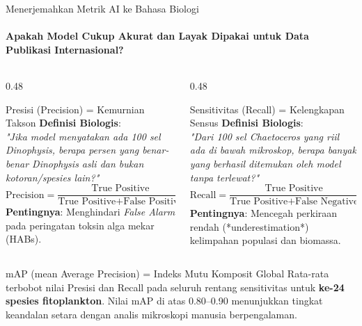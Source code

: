 \documentclass[aspectratio=169, 10pt]{beamer}
\begin{document}
\begin{frame}{Menerjemahkan Metrik AI ke Bahasa Biologi}
    \framesubtitle{Apakah Model Cukup Akurat dan Layak Dipakai untuk Data Publikasi Internasional?}
    
    \begin{columns}[T]
        \begin{column}{0.48\textwidth}
            \begin{conceptcard}{Presisi (Precision) = Kemurnian Takson}
                \scriptsize
                \textbf{Definisi Biologis}:\\
                \textit{"Jika model menyatakan ada 100 sel Dinophysis, berapa persen yang benar-benar Dinophysis asli dan bukan kotoran/spesies lain?"}\\[4pt]
                $$\text{Precision} = \frac{\text{True Positive}}{\text{True Positive} + \text{False Positive}}$$
                \textbf{Pentingnya}: Menghindari \textit{False Alarm} pada peringatan toksin alga mekar (HABs).
            \end{conceptcard}
        \end{column}
        
        \begin{column}{0.48\textwidth}
            \begin{biocard}{Sensitivitas (Recall) = Kelengkapan Sensus}
                \scriptsize
                \textbf{Definisi Biologis}:\\
                \textit{"Dari 100 sel Chaetoceros yang riil ada di bawah mikroskop, berapa banyak yang berhasil ditemukan oleh model tanpa terlewat?"}\\[4pt]
                $$\text{Recall} = \frac{\text{True Positive}}{\text{True Positive} + \text{False Negative}}$$
                \textbf{Pentingnya}: Mencegah perkiraan rendah (*underestimation*) kelimpahan populasi dan biomassa.
            \end{biocard}
        \end{column}
    \end{columns}
    
    \vspace{4pt}
    \begin{alertcard}{mAP (mean Average Precision) = Indeks Mutu Komposit Global}
        \scriptsize
        Rata-rata terbobot nilai Presisi dan Recall pada seluruh rentang sensitivitas untuk \textbf{ke-24 spesies fitoplankton}. Nilai mAP di atas 0.80--0.90 menunjukkan tingkat keandalan setara dengan analis mikroskopi manusia berpengalaman.
    \end{alertcard}
\end{frame}
\end{document}
